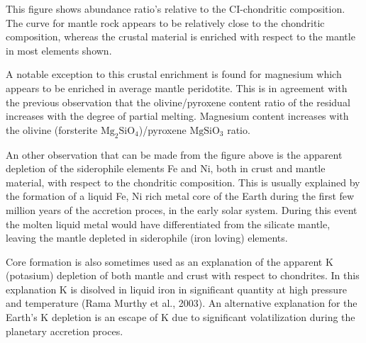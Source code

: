 This figure shows abundance ratio's relative to the CI-chondritic composition.
The curve for mantle rock appears to be relatively close to the chondritic composition,
whereas the crustal material is enriched with respect to the mantle in
most elements shown.

A notable exception to this crustal enrichment is found for magnesium which appears
to be enriched in average mantle peridotite.
This is in agreement with the previous observation that 
the olivine/pyroxene content ratio of the residual increases with the
degree of partial melting.
Magnesium content increases with the olivine 
(forsterite $\mathrm{Mg_2SiO_4}$)/pyroxene $\mathrm{MgSiO_3}$ ratio.

An other observation that can be made from the figure above 
is the apparent depletion of the siderophile elements Fe and Ni, both in
crust and mantle material, with respect to the chondritic composition.
This is usually explained by the formation of a liquid Fe, Ni rich metal core
of the Earth during the first few million years of the accretion proces,
in the early solar system.
During this event the molten liquid metal would have differentiated from the 
silicate mantle, leaving the mantle depleted in siderophile (iron loving) elements.

Core formation is also sometimes used as an explanation of the apparent K
(potasium) depletion of both mantle and crust with respect to chondrites.
In this explanation K is disolved in liquid iron in significant quantity
at high pressure and temperature (Rama Murthy et al., 2003).
An alternative explanation for the Earth's K depletion is an escape
of K due to significant volatilization during the planetary accretion proces. 

